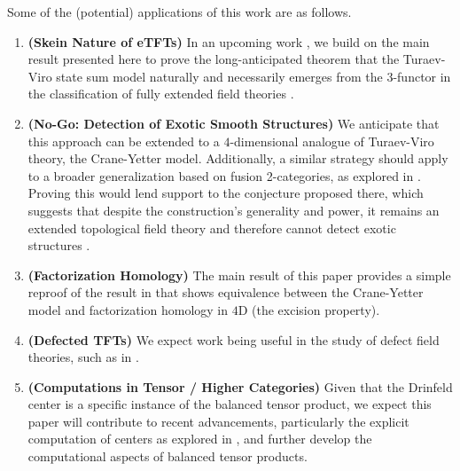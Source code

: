 \noindent Some of the (potential) applications of this work are as follows.

\begin{enumerate}
  \item \textbf{(Skein Nature of eTFTs)} In an upcoming work
        \cite{guu/tv-as-3-functor}, we build on the main result presented here
        to prove the long-anticipated theorem that the Turaev-Viro state sum
        model \cite{viro/turaev-viro-model} naturally and necessarily emerges
        from the 3-functor in the classification of fully extended field
        theories \cite{lurie/tqft} \cite{douglas/dualizable-tensor-categories}.
  \item \textbf{(No-Go: Detection of Exotic Smooth Structures)} We anticipate
        that this approach can be extended to a $4$-dimensional analogue of
        Turaev-Viro theory, the Crane-Yetter model. Additionally, a similar
        strategy should apply to a broader generalization based on fusion
        2-categories, as explored in \cite{douglas/fusion-2-cat-4d-tqft}.
        Proving this would lend support to the conjecture proposed there,
        which suggests that despite the construction's generality and power,
        it remains an extended topological field theory and therefore cannot
        detect exotic structures \cite{reutter/no-go-exotic}.
  \item \textbf{(Factorization Homology)} The main result of this paper
        provides a simple reproof of the result in
        \cite{kirillov/fact-homo-4d-tqft} that shows equivalence between the
        Crane-Yetter model and factorization homology
        \cite{ayala/factorization-homology} in $4$D (the excision property).
  \item \textbf{(Defected TFTs)} We expect work being useful in the study of
        defect field theories, such as in \cite{meusburger/defect-tv}.
  \item \textbf{(Computations in Tensor / Higher Categories)} Given that the
        Drinfeld center is a specific instance of the balanced tensor product,
        we expect this paper will contribute to recent advancements,
        particularly the explicit computation of centers as explored in
        \cite{maurer/computing-center}, and further develop the computational
        aspects of balanced tensor products.
\end{enumerate}


